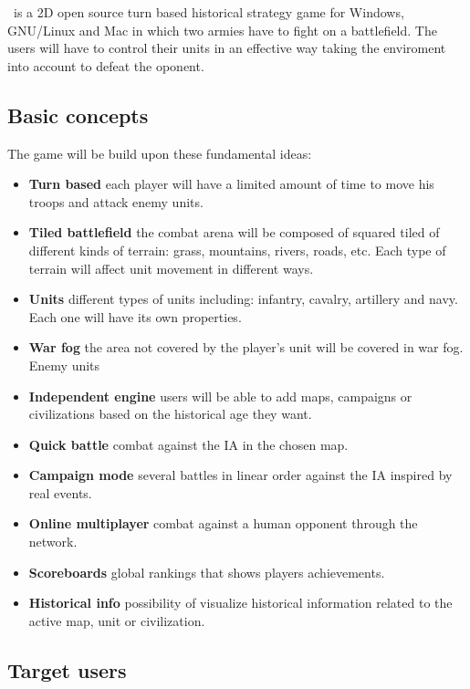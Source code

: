 
\game\ is a 2D open source turn based historical strategy game for
Windows, GNU/Linux and Mac in which two armies have to fight on a
battlefield. The users will have to control their units in an effective
way taking the enviroment into account to defeat the oponent.\\

\subsection{Basic concepts}

The game will be build upon these fundamental ideas:

\begin{itemize}
    \item \textbf{Turn based} each player will have a limited amount of time to
    move his troops and attack enemy units.
    \item \textbf{Tiled battlefield} the combat arena will be composed of squared
    tiled of different kinds of terrain: grass, mountains, rivers, roads,
    etc. Each type of terrain will affect unit movement in different ways.
    \item \textbf{Units} different types of units including: infantry, cavalry,
    artillery and navy. Each one will have its own properties.
    \item \textbf{War fog} the area not covered by the player's unit will be covered
    in war fog. Enemy units 
    \item \textbf{Independent engine} users will be able to add maps, campaigns
    or civilizations based on the historical age they want.
    \item \textbf{Quick battle} combat against the IA in the chosen map.
    \item \textbf{Campaign mode} several battles in linear order against the IA
    inspired by real events.
    \item \textbf{Online multiplayer} combat against a human opponent through the
    network.
    \item \textbf{Scoreboards} global rankings that shows players achievements.
    \item \textbf{Historical info} possibility of visualize historical information
    related to the active map, unit or civilization.
\end{itemize}

\subsection{Target users}


